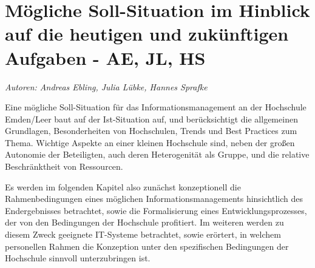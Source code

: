 \chapter{Mögliche Soll-Situation im Hinblick auf die heutigen und zukünftigen Aufgaben - AE, JL, HS}
\label{chapter_sollsituation_INM}
\textit{Autoren: Andreas Ebling, Julia Lübke, Hannes Sprafke}

Eine mögliche Soll-Situation für das Informationsmanagement an der Hochschule Emden/Leer baut auf der Ist-Situation auf, und berücksichtigt die allgemeinen Grundlagen, Besonderheiten von Hochschulen, Trends und Best Practices zum Thema. Wichtige Aspekte an einer kleinen Hochschule sind, neben der großen Autonomie der Beteiligten, auch deren Heterogenität als Gruppe, und die relative Beschränktheit von Ressourcen.

Es werden im folgenden Kapitel also zunächst konzeptionell die Rahmenbedingungen eines möglichen Informationsmanagements hinsichtlich des Endergebnisses betrachtet, sowie die Formalisierung eines Entwicklungsprozesses, der von den Bedingungen der Hochschule profitiert. Im weiteren werden zu diesem Zweck geeignete IT-Systeme betrachtet, sowie erörtert, in welchem personellen Rahmen die Konzeption unter den spezifischen Bedingungen der Hochschule sinnvoll unterzubringen ist.



%

